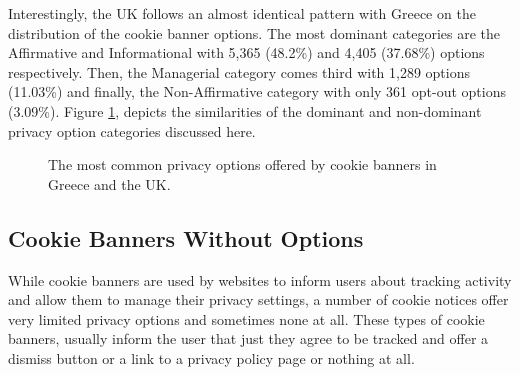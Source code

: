 \documentclass[../main.tex]{subfiles}
\begin{document}
Interestingly, the UK follows an almost identical pattern with Greece on the distribution of the cookie banner options. The most dominant categories are the Affirmative and Informational with 5,365 (48.2\%) and 4,405 (37.68\%) options respectively. Then, the Managerial category comes third with 1,289 options (11.03\%) and finally, the Non-Affirmative category with only 361 opt-out options (3.09\%). Figure \ref{fig:priv_categories_breakdown}, depicts the similarities of the dominant and non-dominant privacy option categories discussed here. 

\categories

\begin{figure}[ht]
    \centering
    \caption{The most common privacy options offered by cookie banners in Greece and the UK.}
    \label{fig:priv_categories_breakdown}
\end{figure}

\subsection{Cookie Banners Without Options}

While cookie banners are used by websites to inform users about tracking activity and allow them to manage their privacy settings, a number of cookie notices offer very limited privacy options and sometimes none at all. These types of cookie banners, usually inform the user that just  they agree to be tracked and offer a dismiss button or a link to a privacy policy page or nothing at all.
\end{document}
